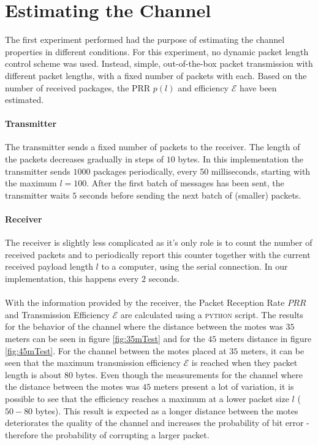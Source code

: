 \section{Estimating the Channel\label{sec:chanEst}}

The first experiment performed had the purpose of estimating the channel properties in different conditions. For this experiment, no dynamic packet length control scheme was used. Instead, simple, out-of-the-box packet transmission  with different packet lengths, with a fixed number of packets with each. Based on the number of received packages, the PRR $p(l)$ and efficiency $\mathcal{E}$ have been estimated.

\paragraph{Transmitter} The transmitter sends a fixed number of packets to the receiver. The length of the packets decreases gradually in steps of $10$ bytes. In this implementation the transmitter sends $1000$ packages periodically, every 50 milliseconds, starting with the maximum $l = 100$. After the first batch of messages has been sent, the transmitter waits $5$ seconds before sending the next batch of (smaller) packets.

\paragraph{Receiver} The receiver is slightly less complicated as it's only role is to count the number of received packets and to periodically report this counter together with the current received payload length $l$ to a computer, using the serial connection. In our implementation, this happens every $2$ seconds.

\paragraph{}With the information provided by the receiver, the Packet Reception Rate $PRR$ and Transmission Efficiency $\mathcal{E}$ are calculated using a \textsc{python} script. The results for the behavior of the channel where the distance between the motes was $35$ meters can be seen in figure \ref{fig:35mTest} and for the $45$ meters distance in figure \ref{fig:45mTest}. For the channel between the motes placed at $35$ meters, it can be seen that the maximum transmission efficiency $\mathcal{E}$ is reached when they packet length is about $80$ bytes. Even though the measurements for the channel where the distance between the motes was $45$ meters present a lot of variation, it is possible to see that the efficiency reaches a maximum at a lower packet size $l$ ($50-80$ bytes). This result is expected as a longer distance between the motes deteriorates the quality of the channel and increases the probability of bit error - therefore the probability of corrupting a larger packet.

